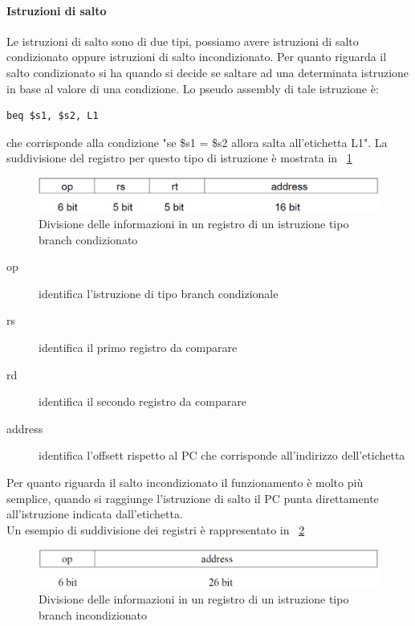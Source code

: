 \paragraph{Istruzioni di salto}
Le istruzioni di salto sono di due tipi, possiamo avere istruzioni di salto condizionato oppure istruzioni di salto incondizionato.
Per quanto riguarda il salto condizionato si ha quando si decide se saltare ad una determinata istruzione in base al valore di una condizione. Lo pseudo assembly di tale istruzione è:
\begin{verbatim}
beq $s1, $s2, L1
\end{verbatim}
che corrisponde alla condizione "se \$s1 = \$s2 allora salta all'etichetta L1".
La suddivisione del registro per questo tipo  di istruzione è mostrata in \figurename~\ref{fig:condbranch}\\
\begin{figure}[htb]
\centering
\includegraphics[scale=0.5]{img/condbranch.png}
\caption{Divisione delle informazioni in un registro di un istruzione tipo branch condizionato}\label{fig:condbranch}
\end{figure}
\begin{description}
\item[op] identifica l'istruzione di tipo branch condizionale
\item[rs] identifica il primo registro da comparare
\item[rd] identifica il secondo registro da comparare
\item[address] identifica l'offsett rispetto al PC che corrisponde all'indirizzo dell'etichetta
\end{description}
Per quanto riguarda il salto incondizionato il funzionamento è molto più semplice, quando si raggiunge l'istruzione di salto il PC punta direttamente all'istruzione indicata dall'etichetta.\\
Un esempio di suddivisione dei registri è rappresentato in \figurename~\ref{fig:uncondbranch} 
\begin{figure}[htb]
\centering
\includegraphics[scale=0.5]{img/uncondbranch.png}
\caption{Divisione delle informazioni in un registro di un istruzione tipo branch incondizionato}\label{fig:uncondbranch}
\end{figure}
